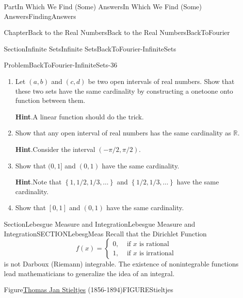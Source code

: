 \documentclass[oneside,10pt,]{book}
\newcommand{\blocktitlefont}{\relax}
\numberwithin{equation}{part}
\newcommand{\RR}{\mathbb {R}}
\newcommand{\amp}{&}
\begin{document}
\begin{partptx}{Part}{In Which We Find (Some) Answers}{}{In Which We Find (Some) Answers}{}{}{FindingAnswers}
\begin{chapterptx}{Chapter}{Back to the Real Numbers}{}{Back to the Real Numbers}{}{}{BackToFourier}
\begin{sectionptx}{Section}{Infinite Sets}{}{Infinite Sets}{}{}{BackToFourier-InfiniteSets}
\begin{problem}{Problem}{}{BackToFourier-InfiniteSets-36}%
\begin{enumerate}[font=\bfseries,label=(\alph*),ref=\alph*]%
\item{}Let \((a,b)\) and \((c,d)\) be two open intervals of real numbers.  Show that these two sets have the same cardinality by constructing a one\textendash{}to\textendash{}one onto function between them.%
\par\smallskip%
\noindent\textbf{\blocktitlefont Hint}.\hypertarget{BackToFourier-InfiniteSets-36-2-2}{}\quad{}A linear function should do the trick.%
\item{}Show that any open interval of real numbers has the same cardinality as \(\RR\).%
\par\smallskip%
\noindent\textbf{\blocktitlefont Hint}.\hypertarget{BackToFourier-InfiniteSets-36-3-2}{}\quad{}Consider the interval \((-\pi/2,\pi/2)\).%
\item{}Show that \((0,1]\) and \((0,1)\) have the same cardinality.%
\par\smallskip%
\noindent\textbf{\blocktitlefont Hint}.\hypertarget{BackToFourier-InfiniteSets-36-4-2}{}\quad{}Note that \(\left\{1,1/2,1/3,\ldots\right\}\) and \(\left\{1/2, 1/3, \ldots\right\}\) have the same cardinality.%
\item{}Show that \([0,1]\) and \((0,1)\) have the same cardinality.%
\end{enumerate}%
\end{problem}
\end{sectionptx}
%
%
\typeout{************************************************}
\typeout{************************************************}
%
\begin{sectionptx}{Section}{Lebesgue Measure and Integration}{}{Lebesgue Measure and Integration}{}{}{SECTIONLebesgMeas}
Recall that the Dirichlet Function%
\begin{equation*}
f(x)=
\begin{cases}
0, \amp \text{ if }  x \text{ is rational}\\
1, \amp \text{ if }  x \text{ is irrational}
\end{cases}
\end{equation*}
is not Darboux (Riemann) integrable.  The existence of non\textendash{}integrable functions lead mathematicians to generalize the idea of an integral.%
\begin{figureptx}{Figure}{\href{https://mathshistory.st-andrews.ac.uk/Biographies/Stieltjes/}{Thomas Jan Stieltjes}\protect\footnotemark{} (1856-1894)}{FIGUREStieltjes}{}%

\end{figureptx}
\end{sectionptx}
\end{chapterptx}
\end{partptx}
\end{document}
